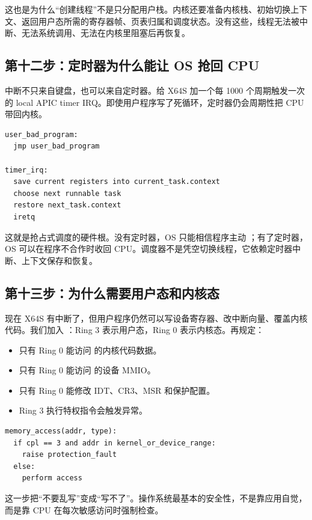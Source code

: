 这也是为什么“创建线程”不是只分配用户栈。内核还要准备内核栈、初始切换上下文、返回用户态所需的寄存器帧、页表归属和调度状态。没有这些，线程无法被中断、无法系统调用、无法在内核里阻塞后再恢复。

\subsection{第十二步：定时器为什么能让 OS 抢回 CPU}

中断不只来自键盘，也可以来自定时器。给 X64S 加一个每 1000 个周期触发一次的 local APIC timer IRQ。即使用户程序写了死循环，定时器仍会周期性把 CPU 带回内核。

\begin{lstlisting}
user_bad_program:
  jmp user_bad_program

timer_irq:
  save current registers into current_task.context
  choose next runnable task
  restore next_task.context
  iretq
\end{lstlisting}

这就是抢占式调度的硬件根。没有定时器，OS 只能相信程序主动 ；有了定时器，OS 可以在程序不合作时收回 CPU。调度器不是凭空切换线程，它依赖定时器中断、上下文保存和恢复。

\subsection{第十三步：为什么需要用户态和内核态}

现在 X64S 有中断了，但用户程序仍然可以写设备寄存器、改中断向量、覆盖内核代码。我们加入 ：Ring 3 表示用户态，Ring 0 表示内核态。再规定：

\begin{itemize}
\tightlist
\item 只有 Ring 0 能访问  的内核代码数据。
\item 只有 Ring 0 能访问  的设备 MMIO。
\item 只有 Ring 0 能修改 IDT、CR3、MSR 和保护配置。
\item Ring 3 执行特权指令会触发异常。
\end{itemize}

\begin{lstlisting}
memory_access(addr, type):
  if cpl == 3 and addr in kernel_or_device_range:
    raise protection_fault
  else:
    perform access
\end{lstlisting}

这一步把“不要乱写”变成“写不了”。操作系统最基本的安全性，不是靠应用自觉，而是靠 CPU 在每次敏感访问时强制检查。

